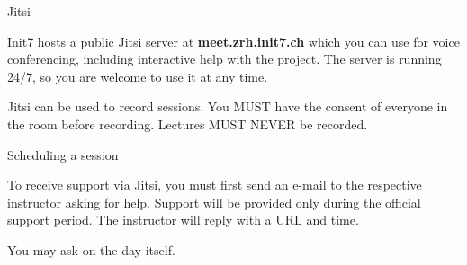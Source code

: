 \documentclass{beamer}
\begin{document}
\begin{frame}{Jitsi}

Init7 hosts a public Jitsi server at {\bf meet.zrh.init7.ch} which you
can use for voice conferencing, including interactive help with the
project. The server is running 24/7, so you are welcome to use it at
any time.

Jitsi can be used to record sessions. You MUST have the consent
of everyone in the room before recording. Lectures MUST NEVER be
recorded.
\end{frame}

\begin{frame}{Scheduling a session}

To receive support via Jitsi, you must first send an e-mail to the
respective instructor asking for help.  Support will be provided only
during the official support period.  The instructor will reply with a
URL and time.
\vfill

You may ask on the day itself.
\vfill

\end{frame}
\end{document}
